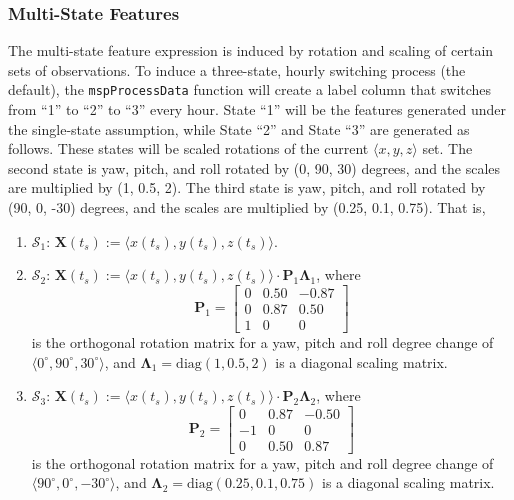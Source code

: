 \documentclass{report}\usepackage[]{graphicx}\usepackage[]{color}
\begin{document}
\subsubsection{Multi-State Features}
The multi-state feature expression is induced by rotation and scaling of certain sets of observations. To induce a three-state, hourly switching process (the default), the \texttt{mspProcessData} function will create a label column that switches from ``1'' to ``2'' to ``3'' every hour. State ``1'' will be the features generated under the single-state assumption, while State ``2'' and State ``3'' are generated as follows. These states will be scaled rotations of the current $\langle x,y,z \rangle$ set. The second state is yaw, pitch, and roll rotated by (0, 90, 30) degrees, and the scales are multiplied by (1, 0.5, 2). The third state is yaw, pitch, and roll rotated by (90, 0, -30) degrees, and the scales are multiplied by (0.25, 0.1, 0.75). That is,
\begin{enumerate}
\item $\mathcal{S}_1$: $\textbf{X}(t_s) := \langle x(t_s), y(t_s), z(t_s)\rangle$.

\item $\mathcal{S}_2$: $\textbf{X}(t_s) := \langle x(t_s), y(t_s), z(t_s)\rangle \cdot \textbf{P}_1\boldsymbol\Lambda_1$, where
\[
  \textbf{P}_1 = \begin{bmatrix}
  0    &  0.50 & -0.87 \\
  0    &  0.87 &  0.50 \\
  1    &  0    &  0
  \end{bmatrix}
\]
is the orthogonal rotation matrix for a yaw, pitch and roll degree change of $\langle 0^{\circ}, 90^{\circ}, 30^{\circ} \rangle$, and $\boldsymbol\Lambda_1 = \text{diag}(1, 0.5, 2)$ is a diagonal scaling matrix.

\item $\mathcal{S}_3$: $\textbf{X}(t_s) := \langle x(t_s), y(t_s), z(t_s)\rangle \cdot \textbf{P}_2\boldsymbol\Lambda_2$, where
\[
  \textbf{P}_2 = \begin{bmatrix}
  0    &  0.87 & -0.50 \\
  -1    &  0    &  0    \\
  0    &  0.50 &  0.87
  \end{bmatrix}
\]
is the orthogonal rotation matrix for a yaw, pitch and roll degree change of $\langle 90^{\circ}, 0^{\circ}, -30^{\circ} \rangle$, and $\boldsymbol\Lambda_2 = \text{diag}(0.25, 0.1, 0.75)$ is a diagonal scaling matrix.
\end{enumerate}
\end{document}
